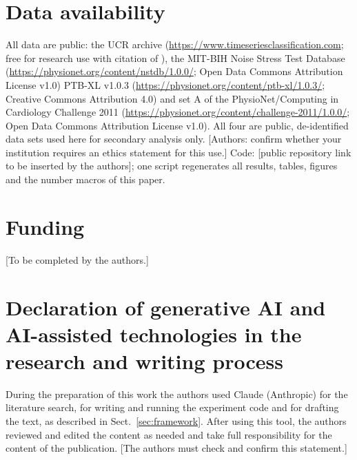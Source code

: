 \documentclass[preprint,12pt,authoryear]{elsarticle}
\begin{document}
\section*{Data availability}
All data are public: the UCR archive (\url{https://www.timeseriesclassification.com}; free for research use with citation of \citet{dau2019ucr}), the MIT-BIH Noise Stress Test Database (\url{https://physionet.org/content/nstdb/1.0.0/}; Open Data Commons Attribution License v1.0) PTB-XL v1.0.3 (\url{https://physionet.org/content/ptb-xl/1.0.3/}; Creative Commons Attribution 4.0) and set A of the PhysioNet/Computing in Cardiology Challenge 2011 (\url{https://physionet.org/content/challenge-2011/1.0.0/}; Open Data Commons Attribution License v1.0). All four are public, de-identified data sets used here for secondary analysis only. [Authors: confirm whether your institution requires an ethics statement for this use.] Code: [public repository link to be inserted by the authors]; one script regenerates all results, tables, figures and the number macros of this paper.

\section*{Funding}
[To be completed by the authors.]

\section*{Declaration of generative AI and AI-assisted technologies in the research and writing process}
During the preparation of this work the authors used Claude (Anthropic) for the literature search, for writing and running the experiment code and for drafting the text, as described in Sect.~\ref{sec:framework}. After using this tool, the authors reviewed and edited the content as needed and take full responsibility for the content of the publication. [The authors must check and confirm this statement.]



\end{document}
